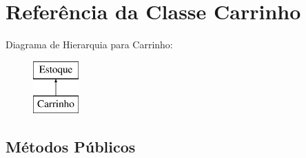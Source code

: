 \hypertarget{class_carrinho}{}\section{Referência da Classe Carrinho}
\label{class_carrinho}
Diagrama de Hierarquia para Carrinho\+:\begin{figure}[H]
\begin{center}
\leavevmode
\includegraphics[height=2.000000cm]{class_carrinho}
\end{center}
\end{figure}
\subsection*{Métodos Públicos}

